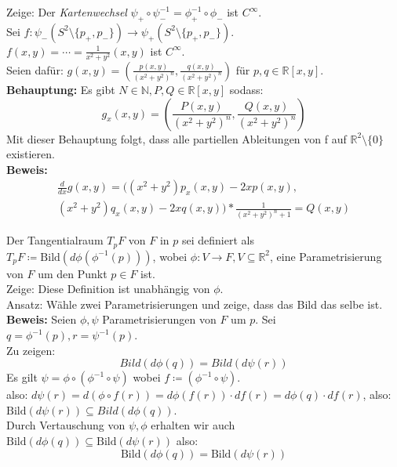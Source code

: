 \begin{problem*}[1b]
  Zeige: Der \emph{Kartenwechsel} \( \psi_+ \circ \psi_-^{-1} = \phi_+^{-1} \circ \phi_- \) ist \( C^{\infty} \). \\
  Sei \( f: \psi_- (S^{2} \setminus \{ p_+, p_- \}) \to \psi_+(S^{2} \setminus \{ p_+, p_- \}) \). \\
  \( f(x,y) = \cdots = \frac{1}{x^2 + y^2}(x,y) \) ist \( C^{\infty} \). \\
  Seien dafür: \( g(x,y) = (\frac{p(x,y)}{{(x^2 + y^2)}^n}, \frac{q(x,y)}{{(x^2 + y^2)}^n}) \) für \( p,q \in \mathbb{R}[x,y] \). \\
  \textbf{Behauptung:} Es gibt \( N \in \mathbb{N}, P, Q \in \mathbb{R}[x,y] \) sodass:
  \begin{equation*}
    g_x(x,y) = \left(\frac{P(x,y)}{{(x^2 + y^2)}^n}, \frac{Q(x,y)}{{(x^2 + y^2)}^n} \right)
  \end{equation*}
  Mit dieser Behauptung folgt, dass alle partiellen Ableitungen von f auf \( \mathbb{R}^2 \setminus \{ 0 \} \) existieren. \\
  \textbf{Beweis:}
  \begin{align*}
    \frac{d}{dx} g(x,y) = ((x^2 + y^2) p_x(x,y) - 2x p(x,y), \\
    (x^2 + y^2) q_x(x,y) - 2x q(x,y))
    * \frac{1}{{(x^2 + y^2)}^n+1} = Q(x,y)
  \end{align*}
\end{problem*}
\begin{problem*}[2a]
  Der Tangentialraum \( T_p F \) von \( F \) in \( p \) sei definiert als \( T_p F \coloneqq \text{Bild}(d \phi (\phi^{-1}(p))) \), wobei \( \phi: V \to F, V \subseteq \mathbb{ R}^2 \), eine Parametrisierung von \( F \) um den Punkt \( p \in F \) ist. \\
  Zeige: Diese Definition ist unabhängig von \( \phi \). \\
  Ansatz: Wähle zwei Parametrisierungen und zeige, dass das Bild das selbe ist. \\
  \textbf{Beweis:} Seien \( \phi, \psi \) Parametrisierungen von \( F \) um \( p \). Sei \( q=\phi^{-1}(p), r=\psi^{-1}(p). \) \\
  Zu zeigen:
  \begin{equation*}
    Bild(d \phi(q)) = Bild(d \psi(r))
  \end{equation*}
  Es gilt \( \psi = \phi \circ (\phi^{-1} \circ \psi) \) wobei \( f \coloneqq (\phi^{-1} \circ \psi) \). \\
  also: \( d \psi(r) = d (\phi \circ f(r)) = d \phi(f(r)) \cdot df(r) = d \phi(q) \cdot df(r) \), also: \\
  \( \text{Bild}(d \psi(r)) \subseteq Bild(d\phi(q)) \). \\
  Durch Vertauschung von \( \psi ,\phi \) erhalten wir auch \( \text{Bild}(d\phi(q)) \subseteq \text{Bild}(d \psi(r)) \) also: 
  \begin{equation*}
    \text{Bild}(d\phi(q)) = \text{Bild}(d \psi(r))
  \end{equation*}
\end{problem*}

